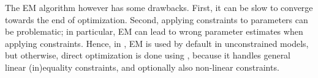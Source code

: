 \documentclass[article]{jss}
\newcommand{\mat}{\mathbf}
\newcommand{\greekv}[1]{\mbox{\boldmath$\mathrm{#1}$}}
\begin{document}



The EM algorithm however has some drawbacks.  First, it can be slow to
converge towards the end of optimization.  Second,
applying constraints to parameters can be problematic; in particular,
EM can lead to wrong parameter estimates when applying constraints.
Hence, in , EM is used by default in unconstrained
models, but otherwise, direct optimization is done using 
\cite{Tamura2009,Spellucci2002}, because it handles general linear
(in)equality constraints, and optionally also non-linear constraints.


\end{document}
